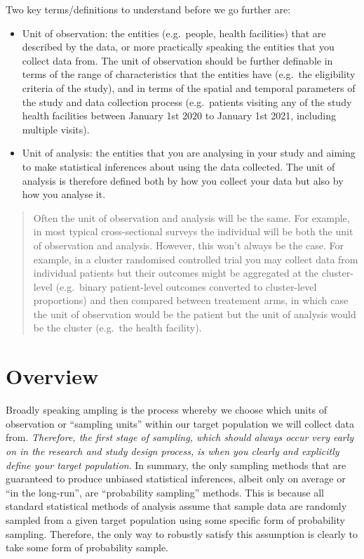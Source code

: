 \documentclass[
]{book}
\begin{document}
Two key terms/definitions to understand before we go further are:

\begin{itemize}
\item
  Unit of observation: the entities (e.g.~people, health facilities) that are described by the data, or more practically speaking the entities that you collect data from. The unit of observation should be further definable in terms of the range of characteristics that the entities have (e.g.~the eligibility criteria of the study), and in terms of the spatial and temporal parameters of the study and data collection process (e.g.~patients visiting any of the study health facilities between January 1st 2020 to January 1st 2021, including multiple visits).
\item
  Unit of analysis: the entities that you are analysing in your study and aiming to make statistical inferences about using the data collected. The unit of analysis is therefore defined both by how you collect your data but also by how you analyse it.
\end{itemize}

\begin{quote}
Often the unit of observation and analysis will be the same. For example, in most typical cross-sectional surveys the individual will be both the unit of observation and analysis. However, this won't always be the case. For example, in a cluster randomised controlled trial you may collect data from individual patients but their outcomes might be aggregated at the cluster-level (e.g.~binary patient-level outcomes converted to cluster-level proportions) and then compared between treatement arms, in which case the unit of observation would be the patient but the unit of analysis would be the cluster (e.g.~the health facility).
\end{quote}

\hypertarget{overview}{%
\section{Overview}\label{overview}}

Broadly speaking ampling is the process whereby we choose which units of observation or ``sampling units'' within our target population we will collect data from. \emph{Therefore, the first stage of sampling, which should always occur very early on in the research and study design process, is when you clearly and explicitly define your target population}. In summary, the only sampling methods that are guaranteed to produce unbiased statistical inferences, albeit only on average or ``in the long-run'', are ``probability sampling'' methods. This is because all standard statistical methods of analysis assume that sample data are randomly sampled from a given target population using some specific form of probability sampling. Therefore, the only way to robustly satisfy this assumption is clearly to take some form of probability sample.
\end{document}
